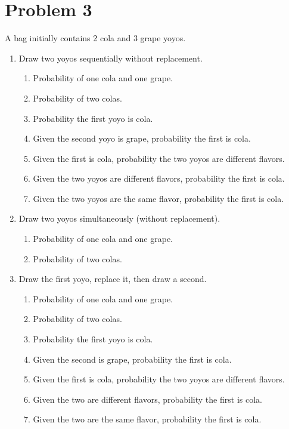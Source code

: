 \section*{Problem 3}
A bag initially contains 2 cola and 3 grape yoyos.
\begin{enumerate}[label=\arabic*.]
    \item Draw two yoyos sequentially without replacement.
    \begin{enumerate}[label=\alph*.]
        \item Probability of one cola and one grape.
        \item Probability of two colas.
        \item Probability the first yoyo is cola.
        \item Given the second yoyo is grape, probability the first is cola.
        \item Given the first is cola, probability the two yoyos are different flavors.
        \item Given the two yoyos are different flavors, probability the first is cola.
        \item Given the two yoyos are the same flavor, probability the first is cola.
    \end{enumerate}
    \item Draw two yoyos simultaneously (without replacement).
    \begin{enumerate}[label=\alph*.]
        \item Probability of one cola and one grape.
        \item Probability of two colas.
    \end{enumerate}
    \item Draw the first yoyo, replace it, then draw a second.
    \begin{enumerate}[label=\alph*.]
        \item Probability of one cola and one grape.
        \item Probability of two colas.
        \item Probability the first yoyo is cola.
        \item Given the second is grape, probability the first is cola.
        \item Given the first is cola, probability the two yoyos are different flavors.
        \item Given the two are different flavors, probability the first is cola.
        \item Given the two are the same flavor, probability the first is cola.
    \end{enumerate}
\end{enumerate}

